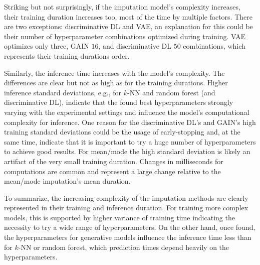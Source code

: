 Striking but not surprisingly, if the imputation model's complexity increases, their training duration increases too, most of the time by multiple factors. There are two exceptions: discriminative DL and VAE, an explanation for this could be their number of hyperparameter combinations optimized during training. VAE optimizes only three, GAIN $16$, and discriminative DL $50$ combinations, which represents their training durations order.

Similarly, the inference time increases with the model's complexity. The differences are clear but not as high as for the training durations.
Higher inference standard deviations, e.g., for $k$-NN and random forest (and discriminative DL), indicate that the found best hyperparameters strongly varying with the experimental settings and influence the model's computational complexity for inference. One reason for the discriminative DL's and GAIN's high training standard deviations could be the usage of early-stopping and, at the same time, indicate that it is important to try a huge number of hyperparameters to achieve good results. For mean/mode the high standard deviation is likely an artifact of the very small training duration. Changes in milliseconds for computations are common and represent a large change relative to the mean/mode imputation's mean duration.

To summarize, the increasing complexity of the imputation methods are clearly represented in their training and inference duration. For training more complex models, this is supported by higher variance of training time indicating the necessity to try a wide range of hyperparameters. On the other hand, once found, the hyperparameters  for generative models influence the inference time less than for $k$-NN or random forest, which prediction times depend heavily on the hyperparameters.
